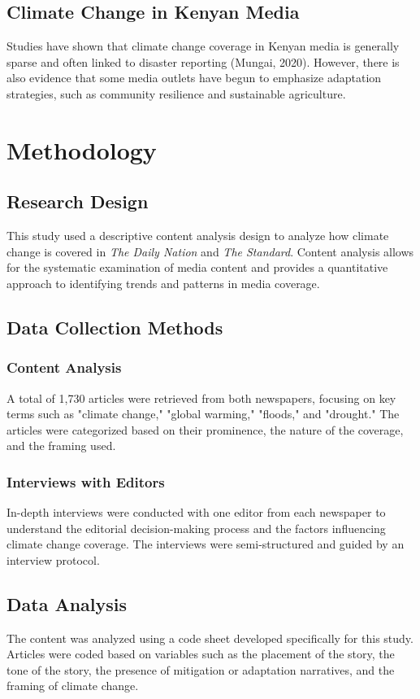 \documentclass[12pt]{report}
\begin{document}
\section{Climate Change in Kenyan Media}
    Studies have shown that climate change coverage in Kenyan media is generally sparse and often linked to disaster reporting (Mungai, 2020). However, there is also evidence that some media outlets have begun to emphasize adaptation strategies, such as community resilience and sustainable agriculture.

\chapter{Methodology}
\section{Research Design}
    This study used a descriptive content analysis design to analyze how climate change is covered in \textit{The Daily Nation} and \textit{The Standard}. Content analysis allows for the systematic examination of media content and provides a quantitative approach to identifying trends and patterns in media coverage.

\section{Data Collection Methods}
    \subsection{Content Analysis}
        A total of 1,730 articles were retrieved from both newspapers, focusing on key terms such as "climate change," "global warming," "floods," and "drought." The articles were categorized based on their prominence, the nature of the coverage, and the framing used.

    \subsection{Interviews with Editors}
        In-depth interviews were conducted with one editor from each newspaper to understand the editorial decision-making process and the factors influencing climate change coverage. The interviews were semi-structured and guided by an interview protocol.

\section{Data Analysis}
    The content was analyzed using a code sheet developed specifically for this study. Articles were coded based on variables such as the placement of the story, the tone of the story, the presence of mitigation or adaptation narratives, and the framing of climate change.
\end{document}
